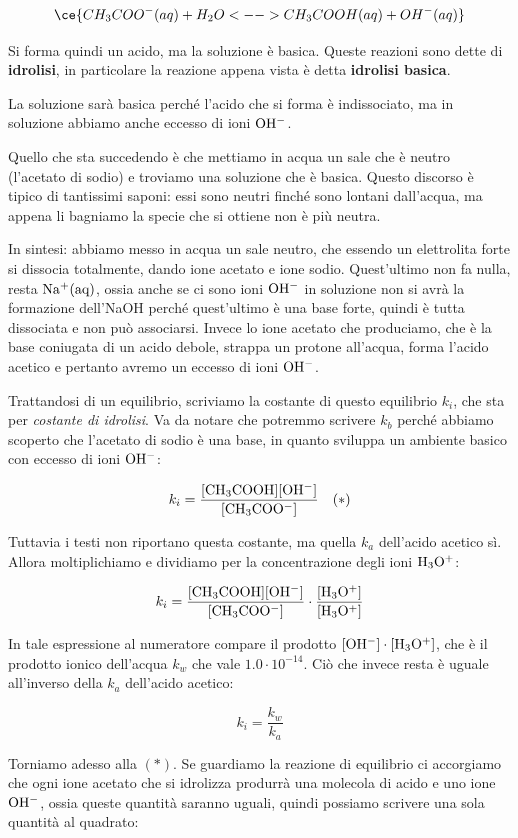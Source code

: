 $$\ce{CH_3COO^-(aq) + H_2O <--> CH_3COOH(aq) + OH^-(aq)}$$

Si forma quindi un acido, ma la soluzione è basica. Queste reazioni sono dette di \textbf{idrolisi}, in particolare la reazione appena vista è detta \textbf{idrolisi basica}.

La soluzione sarà basica perché l'acido che si forma è indissociato, ma in soluzione abbiamo anche eccesso di ioni $\rm OH^-$.

Quello che sta succedendo è che mettiamo in acqua un sale che è neutro (l'acetato di sodio) e troviamo una soluzione che è basica. Questo discorso è tipico di tantissimi saponi: essi sono neutri finché sono lontani dall'acqua, ma appena li bagniamo la specie che si ottiene non è più neutra.

In sintesi: abbiamo messo in acqua un sale neutro, che essendo un elettrolita forte si dissocia totalmente, dando ione acetato e ione sodio. Quest'ultimo non fa nulla, resta $\rm Na^+(aq)$, ossia anche se ci sono ioni $\rm OH^-$ in soluzione non si avrà la formazione dell'NaOH perché quest'ultimo è una base forte, quindi è tutta dissociata e non può associarsi. Invece lo ione acetato che produciamo, che è la base coniugata di un acido debole, strappa un protone all'acqua, forma l'acido acetico e pertanto avremo un eccesso di ioni $\rm OH^-$.

Trattandosi di un equilibrio, scriviamo la costante di questo equilibrio $k_i$, che sta per \textit{costante di idrolisi}. Va da notare che potremmo scrivere $k_b$ perché abbiamo scoperto che l'acetato di sodio è una base, in quanto sviluppa un ambiente basico con eccesso di ioni $\rm OH^-$:

$$k_i = \rm{\frac{[CH_3COOH] [OH^-]}{[CH_3COO^-]}} \quad (*)$$

Tuttavia i testi non riportano questa costante, ma quella $k_a$ dell'acido acetico sì. Allora moltiplichiamo e dividiamo per la concentrazione degli ioni $\rm H_3O^+$:

$$k_i = \rm{\frac{[CH_3COOH] [OH^-]}{[CH_3COO^-]} \cdot \frac{[H_3O^+]}{[H_3O^+]}}$$

In tale espressione al numeratore compare il prodotto $\rm [OH^-] \cdot [H_3O^+]$, che è il prodotto ionico dell'acqua $k_w$ che vale $1.0 \cdot 10^{-14}$. Ciò che invece resta è uguale all'inverso della $k_a$ dell'acido acetico:

$$k_i = \frac{k_w}{k_a}$$

Torniamo adesso alla $(*)$. Se guardiamo la reazione di equilibrio ci accorgiamo che ogni ione acetato che si idrolizza produrrà una molecola di acido e uno ione $\rm OH^-$, ossia queste quantità saranno uguali, quindi possiamo scrivere una sola quantità al quadrato:

